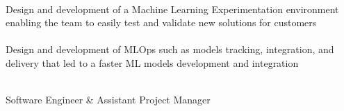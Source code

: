 \documentclass[9pt, green]{template/developercv} %
\begin{document}
{\begin{entrylist}
{\begin{minipage}[t]{0.75\textwidth}
            \vspace{-3mm}\\
            \itemmarker Design and development of a Machine Learning Experimentation environment enabling the team to easily test and validate new solutions for customers\\
            \vspace{-3mm}\\
            \itemmarker Design and development of MLOps such as models tracking, integration, and delivery that led to a faster ML models development and integration\\
            \vspace{-3mm}\\
		\end{minipage}

	}
	{Software Engineer \& Assistant Project Manager}


\end{entrylist}}
\end{document}
